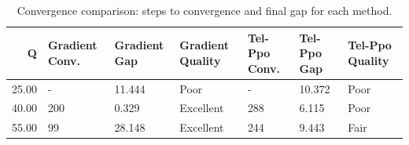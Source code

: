 \begin{table}[htbp]
\centering
\caption{Convergence comparison: steps to convergence and final gap for each method.}
\label{tab:convergence_comparison}
\begin{tabular}{rllllll}
\toprule
Q & Gradient Conv. & Gradient Gap & Gradient Quality & Tel-Ppo Conv. & Tel-Ppo Gap & Tel-Ppo Quality \\
\midrule
25.00 & - & 11.444 & Poor & - & 10.372 & Poor \\
40.00 & 200 & 0.329 & Excellent & 288 & 6.115 & Poor \\
55.00 & 99 & 28.148 & Excellent & 244 & 9.443 & Fair \\
\bottomrule
\end{tabular}

\end{table}
